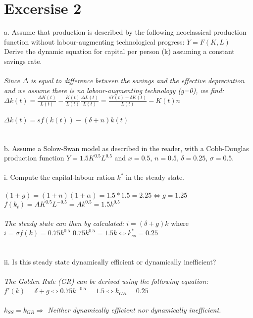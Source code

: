 \documentclass{article}
\begin{document}
\newpage
\section{Excersise 2}\label {sec:ex2}
a. Assume that production is described by the following neoclassical production function without labour-augmenting technological progress: $Y = F (K, L)$\\
Derive the dynamic equation for capital per person (k) assuming a constant savings rate.\\
\\
\textit{Since $\Delta$ is equal to difference between the savings and the effective depreciation and we assume there is no labour-augmenting technology (g=0), we find:}\\
$\Delta k(t) = \frac{\Delta K(t)}{L(t)} - \frac{K(t)}{L(t)} \frac{\Delta L(t)}{L(t)} 
= \frac{sY(t)-\delta K(t)}{L(t)} - K(t)n$\\
\\
$\Delta k(t) = sf(k(t)) - (\delta +n)k(t)$\\
\\
\\
b. Assume a Solow-Swan model as described in the reader, with a Cobb-Douglas production function $Y = 1.5K^{0.5}L^{0.5}$ and $x = 0.5$, $n = 0.5$, $\delta = 0.25$, $\sigma = 0.5$.\\
\\
i. Compute the capital-labour ration $k^*$ in the steady state.\\
\\
$(1+g)=(1+n)(1+\alpha) = 1.5 * 1.5 = 2.25 \Leftrightarrow g=1.25$\\
$f(k_t)=AK^{0.5}L^{-0.5} = Ak^{0.5} = 1.5k^{0.5}$\\
\\
\textit{The steady state can then by calculated:} $i = (\delta + g)k$ where $i=\sigma f(k) = 0.75k^{0.5}$
$0.75k^{0.5} = 1.5k \Leftrightarrow k_{ss}^*=0.25$\\
\\
\\
ii. Is this steady state dynamically efficient or dynamically inefficient?\\
\\
\textit{The Golden Rule (GR) can be derived using the following equation:}\\
$f'(k) = \delta +g \Leftrightarrow 0.75k^{-0.5}=1.5\Leftrightarrow k_{GR}=0.25$ \\
\\
$k_{SS}=k_{GR}\Rightarrow$ \textit{Neither dynamically efficient nor dynamically inefficient.}






	
\end{document}

